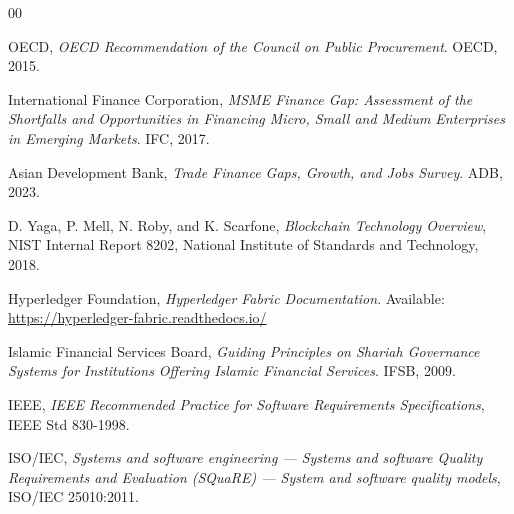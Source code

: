 \documentclass[conference]{IEEEtran}
\begin{document}
\balance
\begin{thebibliography}{00}

OECD, \textit{OECD Recommendation of the Council on Public Procurement}. OECD, 2015.

International Finance Corporation, \textit{MSME Finance Gap: Assessment of the Shortfalls and Opportunities in Financing Micro, Small and Medium Enterprises in Emerging Markets}. IFC, 2017.

Asian Development Bank, \textit{Trade Finance Gaps, Growth, and Jobs Survey}. ADB, 2023.

D. Yaga, P. Mell, N. Roby, and K. Scarfone, \textit{Blockchain Technology Overview}, NIST Internal Report 8202, National Institute of Standards and Technology, 2018.

Hyperledger Foundation, \textit{Hyperledger Fabric Documentation}. Available: \url{https://hyperledger-fabric.readthedocs.io/}

Islamic Financial Services Board, \textit{Guiding Principles on Shariah Governance Systems for Institutions Offering Islamic Financial Services}. IFSB, 2009.

IEEE, \textit{IEEE Recommended Practice for Software Requirements Specifications}, IEEE Std 830-1998.

ISO/IEC, \textit{Systems and software engineering --- Systems and software Quality Requirements and Evaluation (SQuaRE) --- System and software quality models}, ISO/IEC 25010:2011.

\end{thebibliography}
\end{document}
